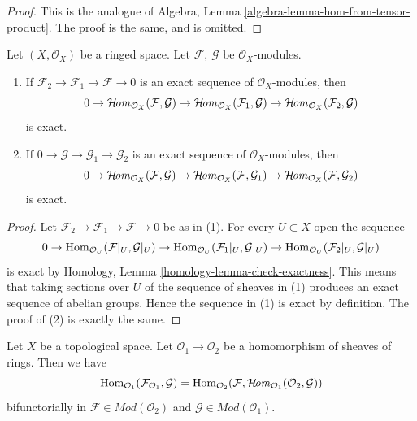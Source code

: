 \begin{proof}
This is the analogue of
Algebra, Lemma \ref{algebra-lemma-hom-from-tensor-product}.
The proof is the same, and is omitted.
\end{proof}

\begin{lemma}
\label{lemma-internal-hom-exact}
\begin{reference}
\cite[Chapter I, \S 1, no. 11, pp. 206--207]{FAC}
\cite[Chapter I, \S 2, no. 14, Proposition 5, pp. 209--210]{FAC}
\end{reference}
Let $(X, \mathcal{O}_X)$ be a ringed space.
Let $\mathcal{F}$, $\mathcal{G}$ be $\mathcal{O}_X$-modules.
\begin{enumerate}
\item If $\mathcal{F}_2 \to \mathcal{F}_1 \to \mathcal{F} \to 0$
is an exact sequence of $\mathcal{O}_X$-modules, then
$$
0 \to
\mathop{\mathcal{H}\!\mathit{om}}\nolimits_{\mathcal{O}_X}(\mathcal{F}, \mathcal{G}) \to
\mathop{\mathcal{H}\!\mathit{om}}\nolimits_{\mathcal{O}_X}(\mathcal{F}_1, \mathcal{G}) \to
\mathop{\mathcal{H}\!\mathit{om}}\nolimits_{\mathcal{O}_X}(\mathcal{F}_2, \mathcal{G})
$$
is exact.
\item If $0 \to \mathcal{G} \to \mathcal{G}_1 \to \mathcal{G}_2$
is an exact sequence of $\mathcal{O}_X$-modules, then
$$
0 \to
\mathop{\mathcal{H}\!\mathit{om}}\nolimits_{\mathcal{O}_X}(\mathcal{F}, \mathcal{G}) \to
\mathop{\mathcal{H}\!\mathit{om}}\nolimits_{\mathcal{O}_X}(\mathcal{F}, \mathcal{G}_1) \to
\mathop{\mathcal{H}\!\mathit{om}}\nolimits_{\mathcal{O}_X}(\mathcal{F}, \mathcal{G}_2)
$$
is exact.
\end{enumerate}
\end{lemma}

\begin{proof}
Let $\mathcal{F}_2 \to \mathcal{F}_1 \to \mathcal{F} \to 0$
be as in (1). For every $U \subset X$ open the sequence
$$
0 \to \mathop{\mathrm{Hom}}\nolimits_{\mathcal{O}_U}(\mathcal{F}|_U, \mathcal{G}|_U) \to
\mathop{\mathrm{Hom}}\nolimits_{\mathcal{O}_U}(\mathcal{F}_1|_U, \mathcal{G}|_U) \to
\mathop{\mathrm{Hom}}\nolimits_{\mathcal{O}_U}(\mathcal{F}_2|_U, \mathcal{G}|_U)
$$
is exact by Homology, Lemma \ref{homology-lemma-check-exactness}.
This means that
taking sections over $U$ of the sequence of sheaves in (1) produces
an exact sequence of abelian groups. Hence the sequence in (1) is exact
by definition. The proof of (2) is exactly the same.
\end{proof}

\begin{lemma}
\label{lemma-adjoint-tensor-restrict}
Let $X$ be a topological space. Let $\mathcal{O}_1 \to \mathcal{O}_2$
be a homomorphism of sheaves of rings. Then we have
$$
\mathop{\mathrm{Hom}}\nolimits_{\mathcal{O}_1}(\mathcal{F}_{\mathcal{O}_1}, \mathcal{G}) =
\mathop{\mathrm{Hom}}\nolimits_{\mathcal{O}_2}(\mathcal{F},
\mathop{\mathcal{H}\!\mathit{om}}\nolimits_{\mathcal{O}_1}(\mathcal{O}_2, \mathcal{G}))
$$
bifunctorially in $\mathcal{F} \in \textit{Mod}(\mathcal{O}_2)$
and $\mathcal{G} \in \textit{Mod}(\mathcal{O}_1)$.
\end{lemma}

